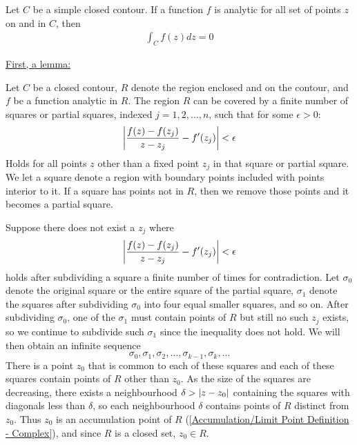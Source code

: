 \documentclass[12pt, english]{book}
\makeatletter
\renewenvironment{proof}[1][\proofname]{\par
	\pushQED{\qed}%
	\normalfont \topsep6\p@\@plus6\p@\relax
	\list{}{%
		\settowidth{\leftmargin}{\itshape\proofname:\hskip\labelsep}%
		\setlength{\labelwidth}{0pt}%
		\setlength{\itemindent}{-\leftmargin}%
	}%
	\item[\hskip\labelsep\itshape#1\@addpunct{:}]\ignorespaces
	}{ \popQED\endlist\@endpefalse}
\makeatother
\begin{document}
	\begin{theorem}
		\label{Cauchy-Goursat Theorem - Complex}
		Let \(C\) be a simple closed contour. If a function \(f\) is analytic for all set of points \(z\) on and in \(C\), then 
		\begin{align*}
			\int_{C} f(z) dz = 0
		\end{align*}
	\end{theorem}
	\begin{proof}
		\underline{First, a lemma:} \newline
		\begin{lemma}
			Let \(C\) be a closed contour, \(R\) denote the region enclosed and on the contour, and \(f\) be a function analytic in \(R\). The region \(R\) can be covered by a finite number of squares or partial squares, indexed \(j = 1, 2, \ldots, n\), such that for some \(\epsilon > 0\): 
			\begin{align*}
				\abs{\frac{f(z) - f(z_j)}{z - z_j} - f'(z_j)} < \epsilon
			\end{align*}
			Holds for all points \(z\) other than a fixed point \(z_j\) in that square or partial square. We let a square denote a region with boundary points included with points interior to it. If a square has points not in \(R\), then we remove those points and it becomes a partial square.
		\end{lemma}
		\begin{proof}
			Suppose there does not exist a \(z_j\) where 
			\begin{align*}
				\abs{\frac{f(z) - f(z_j)}{z - z_j} - f'(z_j)} < \epsilon
			\end{align*}
			holds after subdividing a square a finite number of times for contradiction.
			Let \(\sigma_0\) denote the original square or the entire square of the partial square, \(\sigma_1\) denote the squares after subdividing \(\sigma_0\) into four equal smaller squares, and so on. After subdividing \(\sigma_0\), one of the \(\sigma_1\) must contain points of \(R\) but still no such \(z_j\) exists, so we continue to subdivide such \(\sigma_1\) since the inequality does not hold. We will then obtain an infinite sequence
			\[\sigma_0, \sigma_1, \sigma_2, \ldots, \sigma_{k-1}, \sigma_k, \ldots\]
			There is a point \(z_0\) that is common to each of these squares and each of these squares contain points of \(R\) other than \(z_0\). As the size of the squares are decreasing, there exists a neighbourhood \(\delta > \abs{z - z_0}\) containing the squares with diagonals less than \(\delta\), so each neighbourhood \(\delta\) contains points of \(R\) distinct from \(z_0\). Thus \(z_0\) is an accumulation point of \(R\) (\cref{Accumulation/Limit Point Definition - Complex}), and since \(R\) is a closed set, \(z_0 \in R\).
			

\end{proof}
\end{proof}
\end{document}
